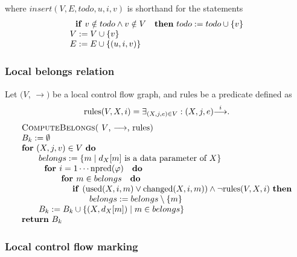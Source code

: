 where $insert(V,E,todo,u,i,v)$ is shorthand for the statements%
\begin{equation*}
\begin{array}{l}
\text{\textbf{if} }v\notin todo\wedge v\notin V\text{ \textbf{then} }%
todo:=todo\cup \{v\} \\ 
V:=V\cup \{v\} \\ 
E:=E\cup \{(u,i,v)\}%
\end{array}%
\end{equation*}%
\newpage

\subsubsection{Local belongs relation}

Let $(V$, $\mathrm{\longrightarrow })$ be a local control flow graph, and $%
\mathrm{rules}$ be a predicate defined as%
\begin{equation*}
\mathrm{rules}(V,X,i)=\exists _{(X,j,e)\in V}:(X,j,e)\overset{i}{\mathrm{%
\longrightarrow }}.
\end{equation*}%
\begin{equation*}
\begin{tabular}{l}
\textsc{ComputeBelongs(} $V$, $\mathrm{\longrightarrow }$, $\mathrm{rules}$%
\textsc{)} \\ 
$B_{k}:=\emptyset $ \\ 
\textbf{for} $(X,j,v)\in V$ \textbf{do} \\ 
$\qquad belongs:=\{m\mid d_{X}[m]$ is a data parameter of $X\}$ \\ 
$\qquad \text{\textbf{for }}i=1\cdots \mathrm{npred}(\varphi )\text{ \textbf{%
do}}$ \\ 
$\qquad \qquad \text{\textbf{for }}m\in belongs\text{ \textbf{do}}$ \\ 
$\qquad \qquad \qquad $\textbf{if }$\left( \mathrm{used}(X,i,m)\vee \mathrm{%
changed}(X,i,m)\right) \wedge \lnot \mathrm{rules}(V,X,i)$ \textbf{then} \\ 
$\qquad \qquad \qquad \qquad belongs:=belongs\setminus \{m\}$ \\ 
$\qquad B_{k}:=B_{k}\cup \{(X,d_{X}[m])\mid m\in belongs\}$ \\ 
\textbf{return} $B_{k}$%
\end{tabular}%
\end{equation*}

\subsubsection{Local control flow marking}

